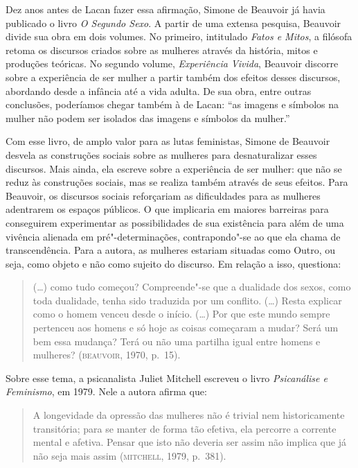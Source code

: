 Dez anos antes de Lacan fazer essa afirmação, Simone de Beauvoir já
havia publicado o livro \emph{O Segundo Sexo}. A partir de uma extensa
pesquisa, Beauvoir divide sua obra em dois volumes. No primeiro,
intitulado \emph{Fatos e Mitos}, a filósofa retoma os discursos criados
sobre as mulheres através da história, mitos e produções teóricas. No
segundo volume, \emph{Experiência Vivida}, Beauvoir discorre sobre a
experiência de ser mulher a partir também dos efeitos desses discursos,
abordando desde a infância até a vida adulta. De sua obra, entre outras
conclusões, poderíamos chegar também à de Lacan: ``as imagens e símbolos
na mulher não podem ser isolados das imagens e símbolos da mulher.''

Com esse livro, de amplo valor para as lutas feministas, Simone de
Beauvoir desvela as construções sociais sobre as mulheres para
desnaturalizar esses discursos. Mais ainda, ela escreve sobre a
experiência de ser mulher: que não se reduz às construções sociais, mas
se realiza também através de seus efeitos. Para Beauvoir, os discursos
sociais reforçariam as dificuldades para as mulheres adentrarem os
espaços públicos. O que implicaria em maiores barreiras para conseguirem
experimentar as possibilidades de sua existência para além de uma
vivência alienada em pré"-determinações, contrapondo"-se ao que ela chama
de transcendência. Para a autora, as mulheres estariam situadas como
Outro, ou seja, como objeto e não como sujeito do discurso. Em relação a
isso, questiona:

\begin{quote}
(\ldots{}) como tudo começou? Compreende"-se que a dualidade dos sexos, como
toda dualidade, tenha sido traduzida por um conflito. (\ldots{}) Resta
explicar como o homem venceu desde o início. (\ldots{}) Por que este mundo
sempre pertenceu aos homens e só hoje as coisas começaram a mudar? Será
um bem essa mudança? Terá ou não uma partilha igual entre homens e
mulheres? (\textsc{beauvoir}, 1970, p.~15).
\end{quote}

Sobre esse tema, a psicanalista Juliet Mitchell escreveu o livro
\emph{Psicanálise e Feminismo}, em 1979. Nele a autora afirma que:

\begin{quote}
A longevidade da opressão das mulheres não é trivial nem
historicamente transitória; para se manter de forma tão efetiva, ela
percorre a corrente mental e afetiva. Pensar que isto não deveria ser
assim não implica que já não seja mais assim (\textsc{mitchell}, 1979, p.~381).
\end{quote}

